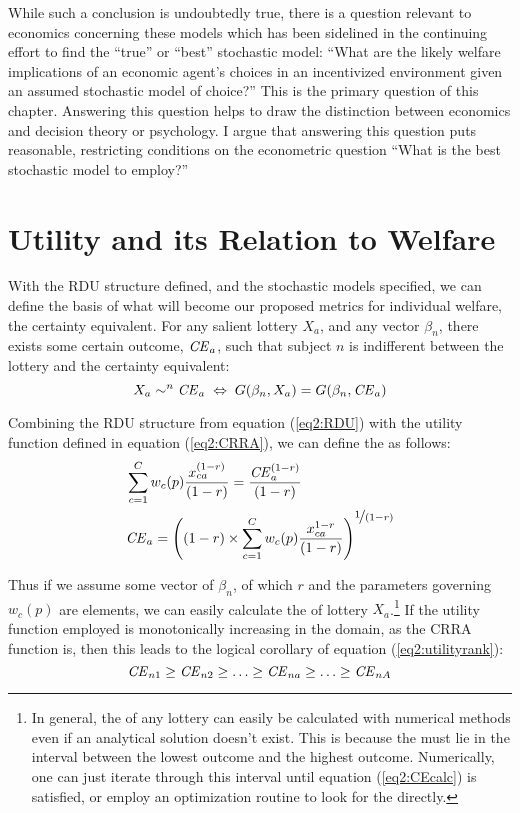 \documentclass[../main.tex]{subfiles}
\begin{document}
While such a conclusion is undoubtedly true, there is a question relevant to economics concerning these models which has been sidelined in the continuing effort to find the \enquote{true} or \enquote{best} stochastic model: \enquote{What are the likely welfare implications of an economic agent's choices in an incentivized environment given an assumed stochastic model of choice?} This is the primary question of this chapter.
Answering this question helps to draw the distinction between economics and decision theory or psychology.
I argue that answering this question puts reasonable, restricting conditions on the econometric question \enquote{What is the best stochastic model to employ?}

\singlespacing
\section{Utility and its Relation to Welfare}
\doublespacing

With the RDU structure defined, and the stochastic models specified, we can define the basis of what will become our proposed metrics for individual welfare, the certainty equivalent.
For any salient lottery $X_a$, and any vector $\beta_n$, there exists some certain outcome, $\mathit{CE}_a$, such that subject $n$ is indifferent between the lottery and the certainty equivalent:
\begin{equation}
	\label{eq2:CE.indiff}
	X_a \sim^n {\mathit{CE}}_a \;\Leftrightarrow\; G(\beta_n,X_a) = G(\beta_n, {\mathit{CE}}_a)
\end{equation}

Combining the RDU structure from equation (\ref{eq2:RDU}) with the utility function defined in equation (\ref{eq2:CRRA}), we can define the {\CE} as follows:
\begin{align}
	\label{eq2:CEcalc}
	\begin{split}
		&\sum_{c=1}^{C} w_c(p) \frac{x_{ca}^{(1-r)}}{(1-r)} = \frac{ {\mathit{CE}}_a^{(1-r)}}{(1-r)}\\
		&{\mathit{CE}}_a =  \left( (1-r) \times \sum_{c=1}^{C} w_c(p) \frac{x_{ca}^{1-r}}{(1-r)} \right)^{ \displaystyle\nicefrac{1}{(1-r)} }
	\end{split}
\end{align}

Thus if we assume some vector of $\beta_n$, of which $r$ and the parameters governing $w_c(p)$ are elements, we can easily calculate the {\CE} of lottery $X_a$.\footnote{ In general, the {\CE} of any lottery can easily be calculated with numerical methods even if an analytical solution doesn't exist.
This is because the {\CE} must lie in the interval between the lowest outcome and the highest outcome.
Numerically, one can just iterate through this interval until equation (\ref{eq2:CEcalc}) is satisfied, or employ an optimization routine to look for the {\CE} directly.}
If the utility function employed is monotonically increasing in the domain, as the CRRA function is, then this leads to the  logical corollary of equation (\ref{eq2:utilityrank}):
\begin{equation}
	\label{eq2:CErank}
	{\ensuremath{\mathit{CE}}}_{n1} \geq {\ensuremath{\mathit{CE}}}_{n2} \geq \ldots \geq {\ensuremath{\mathit{CE}}}_{na} \geq \ldots \geq {\ensuremath{\mathit{CE}}}_{nA}
\end{equation}
\end{document}
